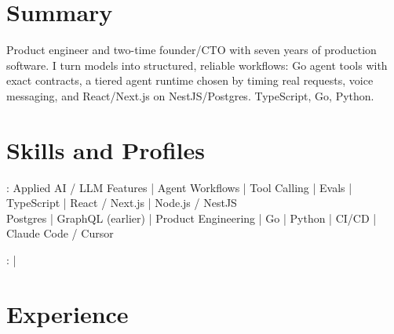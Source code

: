 \documentclass[print]{jack-resume}
\begin{document}
\pagecolor{darkmodeBackground}


\begin{minipage}[t][1cm][t]{.03\textwidth}
    \hfill
\end{minipage}

\section{Summary}
Product engineer and two-time founder/CTO with seven years of production software. I turn models into structured, reliable workflows: Go agent tools with exact contracts, a tiered agent runtime chosen by timing real requests, voice messaging, and React/Next.js on NestJS/Postgres. TypeScript, Go, Python.
\sectionsep

\section{Skills and Profiles}
:
Applied AI / LLM Features \hfill | \hfill
Agent Workflows \hfill | \hfill
Tool Calling \hfill | \hfill
Evals \hfill | \hfill
TypeScript \hfill | \hfill
React / Next.js \hfill | \hfill
Node.js / NestJS \\
\hspace{1.0cm} Postgres \hfill | \hfill
GraphQL (earlier) \hfill | \hfill
Product Engineering \hfill | \hfill
Go \hfill | \hfill
Python \hfill | \hfill
CI/CD \hfill | \hfill
Claude Code / Cursor \\

\raggedright{
    :
      \href{https://www.linkedin.com/in/jack-sturtevant/}{ \ExternalLink} |
     \href{https://github.com/jacksturt}{ \ExternalLink}}

\section{Experience}
\end{document}
